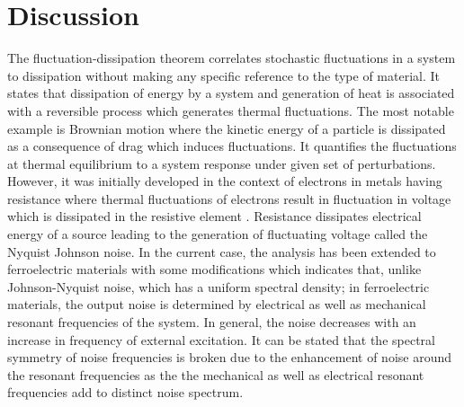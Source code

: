 \documentclass[12pt,column,showpacs,pre,preprintnumbers,amsmath,amssymb,aps,standalone]{revtex4-2}
\begin{document}
\section{Discussion}
The fluctuation-dissipation theorem correlates stochastic fluctuations in a system to dissipation without making any specific reference to the type of material. It states that dissipation of energy by a system and generation of heat is associated with a reversible process which generates thermal fluctuations. The most notable example is Brownian motion where the kinetic energy of a particle is dissipated as a consequence of drag which induces fluctuations. It quantifies the fluctuations at thermal equilibrium to a system response under given set of perturbations. However, it was initially developed in the context of electrons in metals having resistance where thermal fluctuations of electrons result in fluctuation in voltage which is dissipated in the resistive element \cite{1,2}. Resistance dissipates electrical energy of a source leading to the generation of fluctuating voltage called the Nyquist Johnson noise. In the current case, the analysis has been extended to ferroelectric materials with some modifications which indicates that, unlike Johnson-Nyquist noise, which has a uniform spectral density; in ferroelectric materials, the output noise is determined by electrical as well as mechanical resonant frequencies of the system. In general, the noise decreases with an increase in frequency of external excitation. It can be stated that the spectral symmetry of noise frequencies is broken due to the enhancement of noise around the resonant frequencies as the the mechanical as well as electrical resonant frequencies add to distinct noise spectrum.
\end{document}
